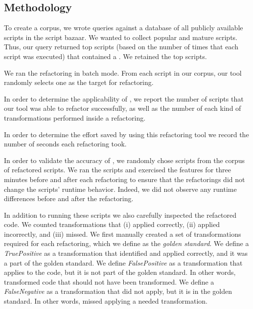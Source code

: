 \documentclass{sigplanconf}
\begin{document}
\subsection{Methodology}

To create a corpus, we wrote queries against a database of all publicly available scripts in the \TD script bazaar. We wanted to collect popular and mature scripts. 
Thus, our query returned top scripts (based on the number of times that each script was executed) 
that contained a \NC{}. We retained the top \numScripts scripts.


We ran the refactoring in batch mode. From each script in our corpus, our tool randomly selects one \NC{} as the target for refactoring. 

In order to determine the applicability of \tool, we report the number of scripts that our tool was able to refactor successfully, as well as the number of each kind of transformations performed inside a refactoring.



In order to determine the effort saved by using this refactoring tool we record the number of seconds each refactoring took. 



In order to validate the accuracy of \tool, we randomly chose \numManual scripts from the corpus of \numScripts refactored scripts. We ran the scripts and exercised the features for three minutes before and after each refactoring to ensure that the refactorings did not change the scripts' runtime behavior. Indeed, we did not observe any runtime differences before and after the refactoring. 

In addition to running these \numManual scripts we also carefully inspected the refactored code. We counted transformations that \tool
(i) applied correctly, (ii) applied incorrectly, and (iii) missed. We first manually created a set of transformations required for each refactoring, which we define as the \emph{golden standard}. We define a {\it TruePositive} as a transformation that \tool identified and applied correctly, and it was a part of the golden standard. 
We define {\it FalsePositive} as a transformation that \tool applies to the code, but it is not part of the golden standard. In other words, \tool transformed code that should not have been transformed.
We define a {\it FalseNegative} as a transformation that \tool did not apply, but it is in the golden standard. In other words, \tool missed applying a needed transformation.
 
\end{document}
